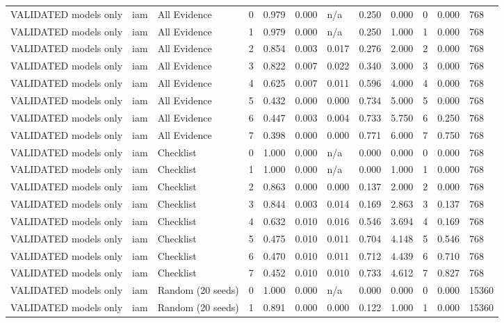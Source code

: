 \begin{table}[!ht]
{\begin{tabular}{llllllllllll}
VALIDATED models only & iam & All Evidence & 0 & 0.979 & 0.000 & n/a & 0.250 & 0.000 & 0 & 0.000 & 768 \\
VALIDATED models only & iam & All Evidence & 1 & 0.979 & 0.000 & n/a & 0.250 & 1.000 & 1 & 0.000 & 768 \\
VALIDATED models only & iam & All Evidence & 2 & 0.854 & 0.003 & 0.017 & 0.276 & 2.000 & 2 & 0.000 & 768 \\
VALIDATED models only & iam & All Evidence & 3 & 0.822 & 0.007 & 0.022 & 0.340 & 3.000 & 3 & 0.000 & 768 \\
VALIDATED models only & iam & All Evidence & 4 & 0.625 & 0.007 & 0.011 & 0.596 & 4.000 & 4 & 0.000 & 768 \\
VALIDATED models only & iam & All Evidence & 5 & 0.432 & 0.000 & 0.000 & 0.734 & 5.000 & 5 & 0.000 & 768 \\
VALIDATED models only & iam & All Evidence & 6 & 0.447 & 0.003 & 0.004 & 0.733 & 5.750 & 6 & 0.250 & 768 \\
VALIDATED models only & iam & All Evidence & 7 & 0.398 & 0.000 & 0.000 & 0.771 & 6.000 & 7 & 0.750 & 768 \\
VALIDATED models only & iam & Checklist & 0 & 1.000 & 0.000 & n/a & 0.000 & 0.000 & 0 & 0.000 & 768 \\
VALIDATED models only & iam & Checklist & 1 & 1.000 & 0.000 & n/a & 0.000 & 1.000 & 1 & 0.000 & 768 \\
VALIDATED models only & iam & Checklist & 2 & 0.863 & 0.000 & 0.000 & 0.137 & 2.000 & 2 & 0.000 & 768 \\
VALIDATED models only & iam & Checklist & 3 & 0.844 & 0.003 & 0.014 & 0.169 & 2.863 & 3 & 0.137 & 768 \\
VALIDATED models only & iam & Checklist & 4 & 0.632 & 0.010 & 0.016 & 0.546 & 3.694 & 4 & 0.169 & 768 \\
VALIDATED models only & iam & Checklist & 5 & 0.475 & 0.010 & 0.011 & 0.704 & 4.148 & 5 & 0.546 & 768 \\
VALIDATED models only & iam & Checklist & 6 & 0.470 & 0.010 & 0.011 & 0.712 & 4.439 & 6 & 0.710 & 768 \\
VALIDATED models only & iam & Checklist & 7 & 0.452 & 0.010 & 0.010 & 0.733 & 4.612 & 7 & 0.827 & 768 \\
VALIDATED models only & iam & Random (20 seeds) & 0 & 1.000 & 0.000 & n/a & 0.000 & 0.000 & 0 & 0.000 & 15360 \\
VALIDATED models only & iam & Random (20 seeds) & 1 & 0.891 & 0.000 & 0.000 & 0.122 & 1.000 & 1 & 0.000 & 15360 \\

\end{tabular}}
\end{table}
